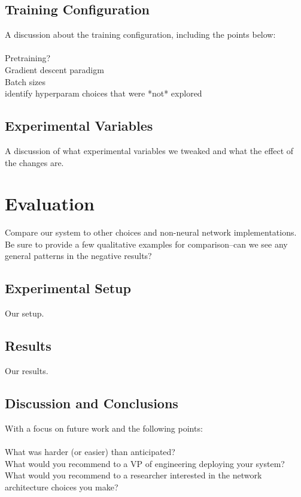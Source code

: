 \documentclass[11pt]{article}
\begin{document}
\subsection{Training Configuration}

A discussion about the training configuration, including the points below: \\
\\
Pretraining? \\
Gradient descent paradigm \\
Batch sizes \\ 
identify hyperparam choices that were *not* explored \\

\subsection{Experimental Variables}
A discussion of what experimental variables we tweaked and what the effect of the changes are.

\section{Evaluation}
Compare our system to other choices and non-neural network implementations.\\
Be sure to provide a few qualitative examples for comparison--can we see any general patterns in the negative results?

\subsection{Experimental Setup}
Our setup. \\

\subsection{Results}
Our results. \\

\subsection{Discussion and Conclusions}
With a focus on future work and the following points: \\
\\
What was harder (or easier) than anticipated? \\ What would you recommend to a VP of engineering deploying your system? \\
What would you recommend to a researcher interested in the network architecture choices you make? \\



 
\end{document}
